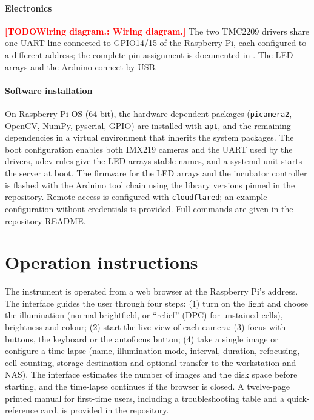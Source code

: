 \documentclass[preprint,12pt]{elsarticle}
\DeclareRobustCommand{\TODO}[1]{\textcolor{red}{\textbf{[TODO\ifx\relax#1\relax\else: #1\fi]}}}
\begin{document}
\paragraph{Electronics} \TODO{Wiring diagram.} The two TMC2209 drivers
share one UART line connected to GPIO14/15 of the Raspberry Pi, each
configured to a different address; the complete pin assignment is
documented in . The LED arrays and the Arduino
connect by USB.

\paragraph{Software installation} On Raspberry Pi OS (64-bit), the
hardware-dependent packages (\texttt{picamera2}, OpenCV, NumPy, pyserial,
GPIO) are installed with \texttt{apt}, and the remaining dependencies in a
virtual environment that inherits the system packages. The boot
configuration enables both IMX219 cameras and the UART used by the
drivers, udev rules give the LED arrays stable names, and a systemd unit
starts the server at boot. The firmware for the LED arrays and the incubator
controller is flashed with the Arduino tool chain using the library
versions pinned in the repository. Remote access is configured with
\texttt{cloudflared}; an example configuration without credentials is
provided. Full commands are given in the repository README.

\section{Operation instructions}

The instrument is operated from a web browser at the Raspberry Pi's
address. The interface guides the user through four steps: (1) turn on the
light and choose the illumination (normal brightfield, or ``relief''
(DPC) for unstained cells), brightness and colour; (2) start the live view
of each camera; (3) focus with buttons, the keyboard or the autofocus
button; (4) take a single image or configure a time-lapse (name,
illumination mode, interval, duration, refocusing, cell counting, storage
destination and optional transfer to the workstation and NAS). The
interface estimates the number of images and the disk space before
starting, and the time-lapse continues if the browser is closed. A
twelve-page printed manual for first-time users, including a
troubleshooting table and a quick-reference card, is provided in the
repository.
\end{document}
